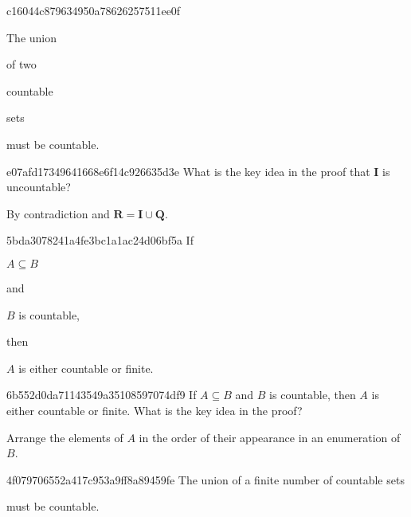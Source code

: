 \begin{note}{c16044c879634950a78626257511ee0f}
    \begin{icloze}{2}The union\end{icloze} of two \begin{icloze}{3}countable\end{icloze} sets \begin{icloze}{1}must be countable.\end{icloze}
\end{note}

\begin{note}{e07afd17349641668e6f14c926635d3e}
    What is the key idea in the proof that \({ \mathbf{I} }\) is uncountable?

    \begin{cloze}{1}
        By contradiction and \({ \mathbf{R} = \mathbf{I} \cup \mathbf{Q} }\).
    \end{cloze}
\end{note}

\begin{note}{5bda3078241a4fe3bc1a1ac24d06bf5a}
    If \begin{icloze}{3}\({ A \subseteq B }\)\end{icloze} and \begin{icloze}{2}\({ B }\) is countable,\end{icloze} then \begin{icloze}{1}\({ A }\) is either countable or finite.\end{icloze}
\end{note}

\begin{note}{6b552d0da71143549a35108597074df9}
    If \({ A \subseteq B }\) and \({ B }\) is countable, then \({ A }\) is either countable or finite.
    What is the key idea in the proof?

    \begin{cloze}{1}
        Arrange the elements of \({ A }\) in the order of their appearance in an enumeration of \({ B }\).
    \end{cloze}
\end{note}

\begin{note}{4f079706552a417c953a9ff8a89459fe}
    The union of a finite number of countable sets \begin{icloze}{1}must be countable.\end{icloze}
\end{note}

